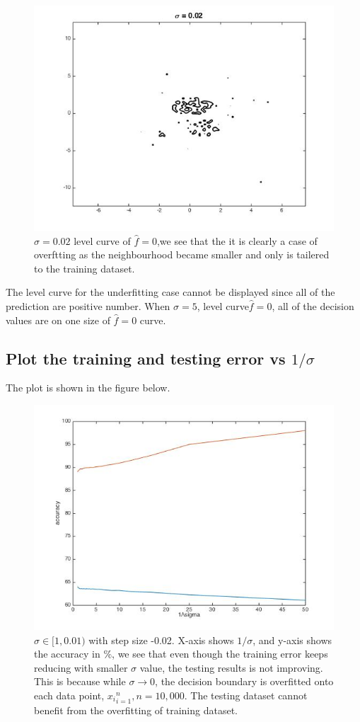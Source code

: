 \documentclass[twoside]{article}
\theoremstyle{definition}
\theoremstyle{definition}
\theoremstyle{remark}
\newcommand{\percent}{$\%$}
\begin{document}
\begin{figure}[H]
\centering
\includegraphics[width=120mm]{sigma_002_lc.jpg}
\caption{ $\sigma = 0.02$ level curve of $\hat f = 0$,we see that the it is clearly a case of overftting as the neighbourhood became smaller and only is tailered to the training dataset. \label{problem2Pic6}}
\end{figure}

The level curve for the underfitting case cannot be displayed since all of the prediction are positive number. When $\sigma = 5$, level curve$\hat f = 0$, all of the decision values are on one size of $\hat f = 0$ curve.

\subsection{Plot the training and testing error vs $1/\sigma$}
The plot is shown in the figure below.
\begin{figure}[H]
\centering
\includegraphics[width=120mm]{training_testing_err.jpg}
\caption{ $\sigma \in [1,0.01)$ with step size -0.02. X-axis shows $1/\sigma$, and y-axis shows the accuracy in \percent, we see that even though the training error keeps reducing with smaller $\sigma$ value, the testing results is not improving. This is because while $\sigma \rightarrow 0$, the decision boundary is overfitted onto each data point, ${x_i}_{i=1}^n, n = 10,000$. The testing dataset cannot benefit from the overfitting of training dataset.} 
\end{figure}
\end{document}
